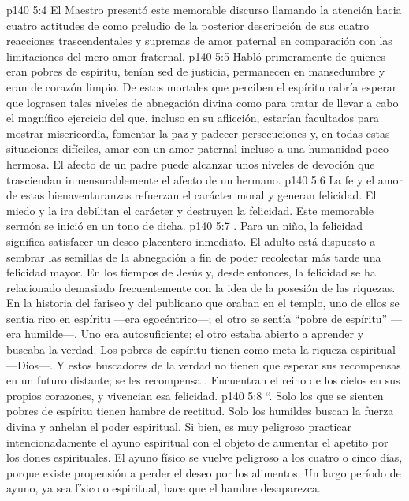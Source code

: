 \vs p140 5:4 \pc El Maestro presentó este memorable discurso llamando la atención hacia cuatro actitudes de  como preludio de la posterior descripción de sus cuatro reacciones trascendentales y supremas de amor paternal en comparación con las limitaciones del mero amor fraternal.
\vs p140 5:5 Habló primeramente de quienes eran pobres de espíritu, tenían sed de justicia, permanecen en mansedumbre y eran de corazón limpio. De estos mortales que perciben el espíritu cabría esperar que lograsen tales niveles de abnegación divina como para tratar de llevar a cabo el magnífico ejercicio del  que, incluso en su aflicción, estarían facultados para mostrar misericordia, fomentar la paz y padecer persecuciones y, en todas estas situaciones difíciles, amar con un amor paternal incluso a una humanidad poco hermosa. El afecto de un padre puede alcanzar unos niveles de devoción que trasciendan inmensurablemente el afecto de un hermano.
\vs p140 5:6 La fe y el amor de estas bienaventuranzas refuerzan el carácter moral y generan felicidad. El miedo y la ira debilitan el carácter y destruyen la felicidad. Este memorable sermón se inició en un tono de dicha.
\vs p140 5:7 . Para un niño, la felicidad significa satisfacer un deseo placentero inmediato. El adulto está dispuesto a sembrar las semillas de la abnegación a fin de poder recolectar más tarde una felicidad mayor. En los tiempos de Jesús y, desde entonces, la felicidad se ha relacionado demasiado frecuentemente con la idea de la posesión de las riquezas. En la historia del fariseo y del publicano que oraban en el templo, uno de ellos se sentía rico en espíritu ---era egocéntrico---; el otro se sentía “pobre de espíritu” ---era humilde---. Uno era autosuficiente; el otro estaba abierto a aprender y buscaba la verdad. Los pobres de espíritu tienen como meta la riqueza espiritual ---Dios---. Y estos buscadores de la verdad no tienen que esperar sus recompensas en un futuro distante; se les recompensa . Encuentran el reino de los cielos en sus propios corazones, y vivencian  esa felicidad.
\vs p140 5:8 “. Solo los que se sienten pobres de espíritu tienen hambre de rectitud. Solo los humildes buscan la fuerza divina y anhelan el poder espiritual. Si bien, es muy peligroso practicar intencionadamente el ayuno espiritual con el objeto de aumentar el apetito por los dones espirituales. El ayuno físico se vuelve peligroso a los cuatro o cinco días, porque existe propensión a perder el deseo por los alimentos. Un largo período de ayuno, ya sea físico o espiritual, hace que el hambre desaparezca.
